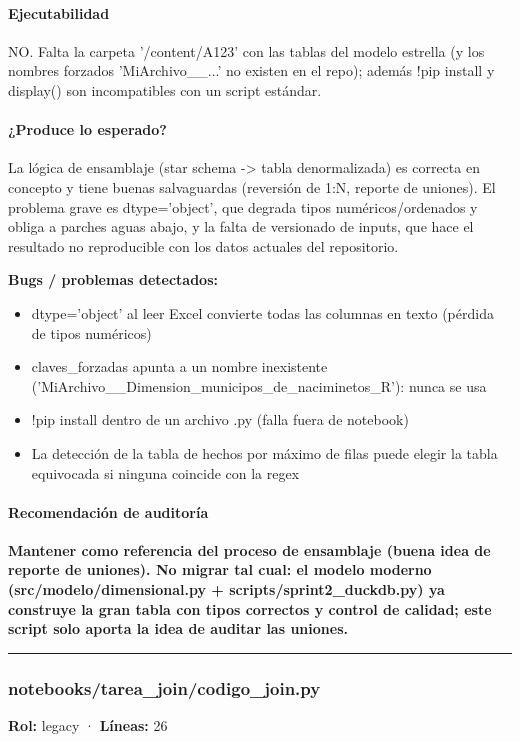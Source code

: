 \paragraph{Ejecutabilidad}
NO. Falta la carpeta '/content/A123' con las tablas del modelo estrella (y los nombres forzados 'MiArchivo\_\_...' no existen en el repo); además !pip install y display() son incompatibles con un script estándar.

\paragraph{¿Produce lo esperado?}
La lógica de ensamblaje (star schema -> tabla denormalizada) es correcta en concepto y tiene buenas salvaguardas (reversión de 1:N, reporte de uniones). El problema grave es dtype='object', que degrada tipos numéricos/ordenados y obliga a parches aguas abajo, y la falta de versionado de inputs, que hace el resultado no reproducible con los datos actuales del repositorio.

\begin{tcolorbox}[riesgo]
\textbf{Bugs / problemas detectados:}
\begin{itemize}
  \item dtype='object' al leer Excel convierte todas las columnas en texto (pérdida de tipos numéricos)
  \item claves\_forzadas apunta a un nombre inexistente ('MiArchivo\_\_Dimension\_municipos\_de\_naciminetos\_R'): nunca se usa
  \item !pip install dentro de un archivo .py (falla fuera de notebook)
  \item La detección de la tabla de hechos por máximo de filas puede elegir la tabla equivocada si ninguna coincide con la regex
\end{itemize}
\end{tcolorbox}

\paragraph{Recomendación de auditoría}
\textbf{Mantener como referencia del proceso de ensamblaje (buena idea de reporte de uniones). No migrar tal cual: el modelo moderno (src/modelo/dimensional.py + scripts/sprint2\_duckdb.py) ya construye la gran tabla con tipos correctos y control de calidad; este script solo aporta la idea de auditar las uniones.}

\medskip
\hrule

\subsubsection{notebooks/tarea\_join/codigo\_join.py}
\textbf{Rol:} legacy · \textbf{Líneas:} 26

